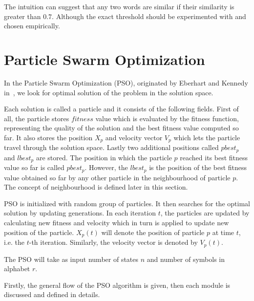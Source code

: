 \documentclass{mini}
\begin{document}
The intuition can suggest that any two words are similar if their similarity is greater than $0.7$. Although the exact threshold should be experimented with and chosen empirically.




\chapter{Particle Swarm Optimization}\label{chap:pso}
In the Particle Swarm Optimization (PSO), originated by Eberhart and Kennedy in~\cite{pso_origin}, we look for optimal solution of the problem in the solution space. 

Each solution is called a particle and it consists of the following fields. First of all, the particle stores $fitness$ value which is evaluated by the fitness function, representing the quality of the solution and the best fitness value computed so far. It also stores the position $X_p$ and velocity vector $V_p$ which lets the particle travel through the solution space. Lastly two additional positions called $pbest_p$ and $lbest_p$ are stored. The position in which the particle $p$ reached its best fitness value so far is called $pbest_p$. However, the $lbest_p$ is the position of the best fitness value obtained so far by any other particle in the neighbourhood of particle $p$. The concept of neighbourhood is defined later in this section.

PSO is initialized with random group of particles. It then searches for the optimal solution by updating generations.
In each iteration $t$, the particles are updated by calculating new fitness and velocity which in turn is applied to update new position of the particle. $X_p(t)$ will denote the position of particle $p$ at time $t$, i.e. the $t$-th iteration. Similarly, the velocity vector is denoted by $V_p(t)$.

The PSO will take as input number of states $n$ and number of symbols in alphabet $r$.

Firstly, the general flow of the PSO algorithm is given, then each module is discussed and defined in details.
\end{document}
